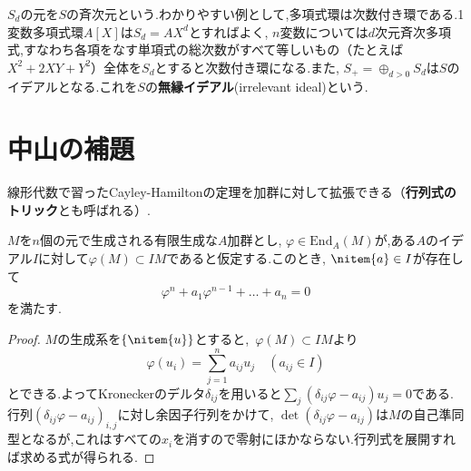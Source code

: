 $S_d$の元を$S$の斉次元という.わかりやすい例として,多項式環は次数付き環である.1変数多項式環$A[X]$は$S_d=AX^d$とすればよく, $n$変数については$d$次元斉次多項式,すなわち各項をなす単項式の総次数がすべて等しいもの（たとえば$X^2+2XY+Y^2$）全体を$S_d$とすると次数付き環になる.また, $S_+=\oplus_{d>0}S_d$は$S$のイデアルとなる.これを$S$の\textbf{無縁イデアル}(irrelevant ideal)という.



\section{中山の補題}


線形代数で習ったCayley-Hamiltonの定理を加群に対して拡張できる（\textbf{行列式のトリック}とも呼ばれる）.
\begin{thm}
	\label{thm:Cayley-Hamilton}
	$M$を$n$個の元で生成される有限生成な$A$加群とし, $\varphi\in\text{End}_A(M)$が,ある$A$のイデアル$I$に対して$\varphi(M)\subset IM$であると仮定する.このとき, $\nitem{a}\in I$が存在して
	\[\varphi^n+a_1\varphi^{n-1}+\dots+a_n=0\]
	を満たす.
\end{thm}
\begin{proof}
	$M$の生成系を$\{\nitem{u}\}$とすると,~$\varphi(M)\subset IM$より
	\[\varphi(u_i)=\sum_{j=1}^n a_{ij}u_j\quad(a_{ij}\in I)\]
	とできる.よってKroneckerのデルタ$\delta_{ij}$を用いると$\sum_j(\delta_{ij}\varphi-a_{ij})u_j=0$である.行列$(\delta_{ij}\varphi-a_{ij})_{i,j}$に対し余因子行列をかけて, $\det(\delta_{ij}\varphi-a_{ij})$は$M$の自己準同型となるが,これはすべての$x_i$を消すので零射にほかならない.行列式を展開すれば求める式が得られる.
\end{proof}

